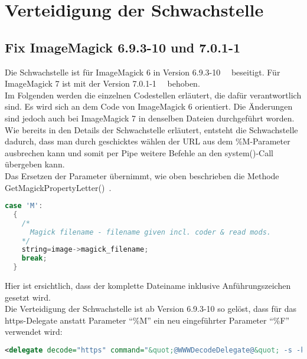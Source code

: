 \newpage
\section{Verteidigung der Schwachstelle}\label{sec:verteidigung-der-schwachstelle}
\subsection{Fix ImageMagick 6.9.3-10 und 7.0.1-1}\label{subsec:fix-imagemagick-6.9.3-10}

Die Schwachstelle ist für ImageMagick 6 in Version 6.9.3-10~\cite{Fix6A}~\cite{Fix6B} beseitigt.
Für ImageMagick 7 ist mit der Version 7.0.1-1~\cite{Fix7A}~\cite{Fix7B} behoben.\\
Im Folgenden werden die einzelnen Codestellen erläutert, die dafür verantwortlich sind.
Es wird sich an dem Code von ImageMagick 6 orientiert.
Die Änderungen sind jedoch auch bei ImageMagick 7 in denselben Dateien durchgeführt worden.\\

Wie bereits in den Details der Schwachstelle erläutert,
entsteht die Schwachstelle dadurch,
dass man durch geschicktes wählen der URL aus dem \%M-Parameter ausbrechen kann und
somit per Pipe weitere Befehle an den system()-Call übergeben kann.\\

Das Ersetzen der Parameter übernimmt, wie oben beschrieben die Methode\\ GetMagickPropertyLetter()~\cite{DeklarationGetMgickPropertyLetter}.

\begin{lstlisting}[firstnumber=2627, language=C, caption=magick/property.c Ungefilterte Weitergabe M-Parameter,label={lst:lstlisting}]
  case 'M':
  {
    /*
      Magick filename - filename given incl. coder & read mods.
    */
    string=image->magick_filename;
    break;
  }
\end{lstlisting}
\vspace{5mm}

Hier ist ersichtlich, dass der komplette Dateiname inklusive Anführungszeichen gesetzt wird.\\

Die Verteidigung der Schwachstelle ist ab Version 6.9.3-10 so gelöst, dass für das https-Delegate anstatt Parameter "`\%M"' ein neu eingeführter Parameter "`\%F"'~\cite{CompareDelegatexXML} verwendet wird:\\

\begin{lstlisting}[firstnumber=91, language=XML, caption=config/delegates.xml.in https-Delegate 6.9.3-10,label={lst:lstlisting}]
  <delegate decode="https" command="&quot;@WWWDecodeDelegate@&quot; -s -k -L -o &quot;%o&quot; &quot;https:%F&quot;"/>
\end{lstlisting}
\vspace{5mm}

